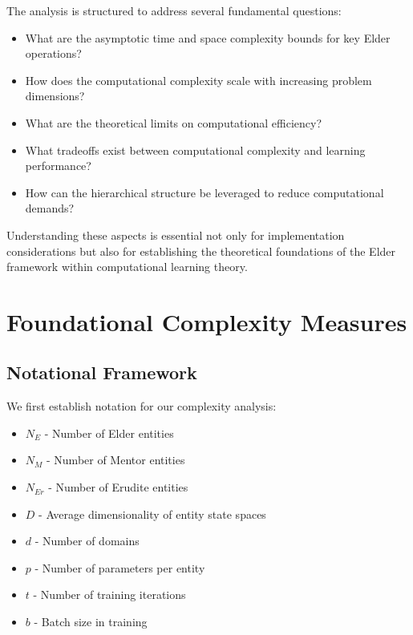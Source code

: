 The analysis is structured to address several fundamental questions:
\begin{itemize}
    \item What are the asymptotic time and space complexity bounds for key Elder operations?
    \item How does the computational complexity scale with increasing problem dimensions?
    \item What are the theoretical limits on computational efficiency?
    \item What tradeoffs exist between computational complexity and learning performance?
    \item How can the hierarchical structure be leveraged to reduce computational demands?
\end{itemize}

Understanding these aspects is essential not only for implementation considerations but also for establishing the theoretical foundations of the Elder framework within computational learning theory.

\section{Foundational Complexity Measures}



\subsection{Notational Framework}

We first establish notation for our complexity analysis:

\begin{itemize}
    \item $N_E$ - Number of Elder entities
    \item $N_M$ - Number of Mentor entities
    \item $N_{Er}$ - Number of Erudite entities
    \item $D$ - Average dimensionality of entity state spaces
    \item $d$ - Number of domains
    \item $p$ - Number of parameters per entity
    \item $t$ - Number of training iterations
    \item $b$ - Batch size in training
\end{itemize}

